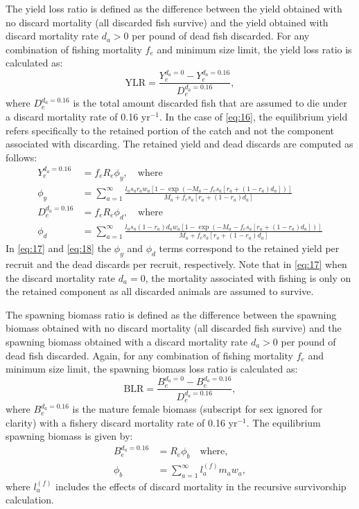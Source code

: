 \documentclass[12pt]{article}
\begin{document}
The yield loss ratio is defined as the difference between the yield obtained with no discard mortality (all discarded fish survive) and the yield obtained with discard mortality rate $d_a>0$ per pound of dead fish discarded.  For any combination of fishing mortality $f_e$ and minimum size limit, the yield loss ratio is calculated as:
\begin{equation}\label{eq:16}
	\mathrm{YLR} = \frac{Y_e^{d_a=0} - Y_e^{d_a=0.16}}{D_e^{d_a=0.16}},
\end{equation}
where $D_e^{d_a=0.16}$ is the total amount discarded fish that are assumed to die under a discard mortality rate of 0.16 yr$^{-1}$. In the case of \eqref{eq:16}, the equilibrium yield refers specifically to the retained portion of the catch and not the component associated with discarding. The retained yield and dead discards are computed as follows:
\begin{align}
	Y_e^{d_a=0.16} &= f_e R_e \phi_y, \quad \mbox{where} \label{eq:17}\\
	 \phi_y &=  \sum_{a=1}^\infty 
	\frac{l_a s_a r_a w_a [1-\exp(-M_a-f_e s_a [r_a+(1-r_a)d_a])]}
	{M_a+f_e s_a [r_a+(1-r_a)d_a]} \nonumber \\[2ex]
	D_e^{d_a=0.16} & = f_e R_e \phi_d, \quad \mbox{where}\label{eq:18}\\
	\phi_d &=  \sum_{a=1}^\infty 
	\frac{l_a s_a (1-r_a)d_a w_a [1-\exp(-M_a-f_e s_a [r_a+(1-r_a)d_a])]}
	{M_a+f_e s_a [r_a+(1-r_a)d_a]} \nonumber 
\end{align}
In \eqref{eq:17} and \eqref{eq:18} the $\phi_y$ and $\phi_d$ terms correspond to the retained yield per recruit and the dead discards per recruit, respectively.  Note that in \eqref{eq:17} when the discard mortality rate $d_a=0$, the mortality associated with fishing is only on the retained component as all discarded animals are assumed to survive.

The spawning biomass ratio is defined as the difference between the spawning biomass obtained with no discard mortality (all discarded fish survive) and the spawning biomass obtained with a discard mortality rate $d_a>0$ per pound of dead fish discarded. Again, for any combination of fishing mortality $f_e$ and minimum size limit, the spawning biomass loss ratio is calculated as:
\begin{equation}\label{eq:19}
	\mathrm{BLR} = \frac{B_e^{d_a=0}-B_e^{d_a=0.16}}{D_e^{d_a=0.16}},
\end{equation}
where $B_e^{d_a=0.16}$ is the mature female biomass (subscript for sex ignored for clarity) with a fishery discard mortality rate of 0.16 yr$^{-1}$.  The equilibrium spawning biomass is given by:
\begin{align}
	B_e^{d_a=0.16}&=R_e \phi_b \quad \mbox{where,}\label{eq:20}\\
	\phi_b & = \sum_{a=1}^\infty l_a^{(f)} m_a w_a \nonumber, 
\end{align}
where $l_a^{(f)}$ includes the effects of discard mortality in the recursive survivorship calculation.  
\end{document}
